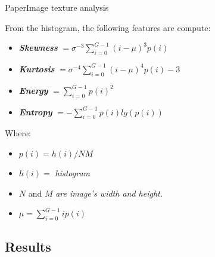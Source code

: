 \documentclass[10pt]{beamer}
\newcommand{\1}{
	\setbeamertemplate{background}{
		\texttt{[image: img/1\_dna]}
		\tikz[overlay] \fill[fill opacity=0.75,fill=white] (0,0) rectangle (-\paperwidth,\paperheight);
	}
}
\begin{document}
\begin{frame}{Paper}{Image texture analysis}
	\begin{block}{}
		From the histogram, the following features are compute:
		\begin{itemize}
			\item \textbf{\textit{Skewness}} $ = \sigma^{-3} \sum_{i=0}^{G-1} (i - \mu)^3 p(i)$
			\item \textbf{\textit{Kurtosis}} $ = \sigma^{-4} \sum_{i=0}^{G-1} (i - \mu)^4 p(i)-3$
			\item \textbf{\textit{Energy}} $ = \sum_{i=0}^{G-1} p(i)^2$
			\item \textbf{\textit{Entropy}} $ = -\sum_{i=0}^{G-1} p(i)lg(p(i))$
		\end{itemize}
	\end{block}
	
	\begin{block}{}
		Where: 
		\begin{itemize}	
			\item	$p(i) = h(i)/NM$ 
			\item	$h(i) =$ \textit{histogram} 
			\item	$N$ and $M$ \textit{are image's width and height.} 
			\item	$\mu = \sum_{i=0}^{G-1}ip(i)$
		\end{itemize}
	\end{block}
\end{frame}




\subsection{Results}
\end{document}
